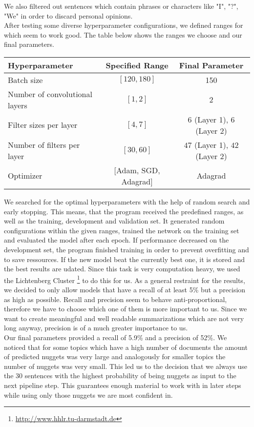 We also filtered out sentences which contain phrases or characters like "I", "?", "We" in order to discard personal opinions.\\
After testing some diverse hyperparameter configurations, we defined ranges for which seem to work good. The table below shows the ranges we choose and our final parameters. \\
\begin{center}
\begin{tabular}{ l | c | c } \\
Hyperparameter & Specified Range & Final Parameter \\ \hline
Batch size & $[120, 180]$ & 150 \\
Number of convolutional layers & $[1, 2]$ & 2 \\
Filter sizes per layer & $[4, 7]$ & $6$ (Layer 1), $6$ (Layer 2) \\
Number of filters per layer & $[30, 60]$ & $47$ (Layer 1), $42$ (Layer 2) \\
Optimizer & [Adam, SGD, Adagrad] & Adagrad
\end{tabular}
\end{center}
We searched for the optimal hyperparameters with the help of random search and early stopping. This means, that the program received the predefined ranges, as well as the training, development and validation set. It generated random configurations within the given ranges, trained the network on the training set and evaluated the model after each epoch. If performance decreased on the development set, the program finished training in order to prevent overfitting and to save ressources. If the new model beat the currently best one, it is stored and the best results are udated. Since this task is very computation heavy, we used the Lichtenberg Cluster \footnote[4]{\url{http://www.hhlr.tu-darmstadt.de}} to do this for us. As a general restraint for the results, we decided to only allow models that have a recall of at least 5\% but a precision as high as possible. Recall and precision seem to behave anti-proportional, therefore we have to choose which one of them is more important to us. Since we want to create meaningful and well readable summarizations which are not very long anyway, precision is of a much greater importance to us. \\
Our final parameters provided a recall of 5.9\% and a precision of 52\%. We noticed that for some topics which have a high number of documents the amount of predicted nuggets was very large and analogously for smaller topics the number of nuggets was very small. This led us to the decision that we always use the 30 sentences with the highest probability of being nuggets as input to the next pipeline step. This guarantees enough material to work with in later steps while using only those nuggets we are most confident in.\\
